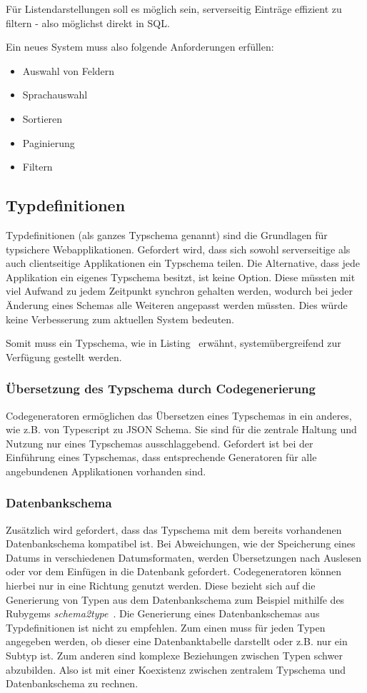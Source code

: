 Für Listendarstellungen soll es möglich sein, serverseitig Einträge effizient zu filtern - also möglichst direkt in SQL.

Ein neues System muss also folgende Anforderungen erfüllen:
\begin{itemize}
	\setlength\itemsep{-1em}
	\item Auswahl von Feldern
	\item Sprachauswahl
	\item Sortieren
	\item Paginierung
	\item Filtern
\end{itemize}
\subsection{Typdefinitionen}

Typdefinitionen (als ganzes Typschema genannt) sind die Grundlagen für typsichere Webapplikationen.
Gefordert wird, dass sich sowohl serverseitige als auch clientseitige Applikationen ein Typschema teilen. 
Die Alternative, dass jede Applikation ein eigenes Typschema besitzt, ist keine Option. Diese müssten mit viel Aufwand zu jedem Zeitpunkt synchron gehalten werden, wodurch bei jeder Änderung eines Schemas alle Weiteren angepasst werden müssten. Dies würde keine Verbesserung zum aktuellen System bedeuten.

Somit muss ein Typschema, wie in Listing~ erwähnt, systemübergreifend zur Verfügung gestellt werden.

\subsubsection{Übersetzung des Typschema durch Codegenerierung}
Codegeneratoren ermöglichen das Übersetzen eines Typschemas in ein anderes, wie z.B. von Typescript zu JSON Schema.
Sie sind für die zentrale Haltung und Nutzung nur eines Typschemas ausschlaggebend.
Gefordert ist bei der Einführung eines Typschemas, dass entsprechende Generatoren für alle angebundenen Applikationen vorhanden sind.

\subsubsection{Datenbankschema}
Zusätzlich wird gefordert, dass das Typschema mit dem bereits vorhandenen Datenbankschema kompatibel ist.
Bei Abweichungen, wie der Speicherung eines Datums in verschiedenen Datumsformaten,
werden Übersetzungen nach Auslesen oder vor dem Einfügen in die Datenbank gefordert.
Codegeneratoren können hierbei nur in eine Richtung genutzt werden.
Diese bezieht sich auf die Generierung von Typen aus dem Datenbankschema zum Beispiel mithilfe des Rubygems \emph{schema2type}~\cite{schema2type}.
Die Generierung eines Datenbankschemas aus Typdefinitionen ist nicht zu empfehlen.
Zum einen muss für jeden Typen angegeben werden, ob dieser eine Datenbanktabelle darstellt oder z.B. nur ein Subtyp ist.
Zum anderen sind komplexe Beziehungen zwischen Typen schwer abzubilden.
Also ist mit einer Koexistenz zwischen zentralem Typschema und Datenbankschema zu rechnen.

